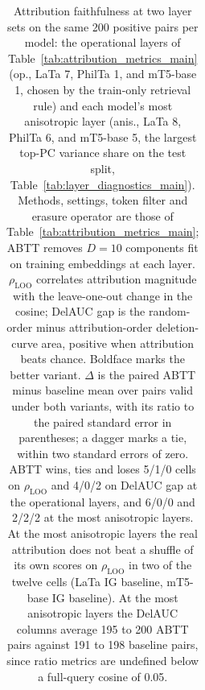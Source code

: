 \begin{table}[t]
\begin{tabular}{lllrrrrrr}
\bottomrule
\end{tabular}
\caption{Attribution faithfulness at two layer sets on the same 200 positive pairs per model: the operational layers of Table~\ref{tab:attribution_metrics_main} (op., LaTa 7, PhilTa 1, and mT5-base 1, chosen by the train-only retrieval rule) and each model's most anisotropic layer (anis., LaTa 8, PhilTa 6, and mT5-base 5, the largest top-PC variance share on the test split, Table~\ref{tab:layer_diagnostics_main}). Methods, settings, token filter and erasure operator are those of Table~\ref{tab:attribution_metrics_main}; ABTT removes $D=10$ components fit on training embeddings at each layer. $\rho_{\text{LOO}}$ correlates attribution magnitude with the leave-one-out change in the cosine; DelAUC gap is the random-order minus attribution-order deletion-curve area, positive when attribution beats chance. Boldface marks the better variant. $\Delta$ is the paired ABTT minus baseline mean over pairs valid under both variants, with its ratio to the paired standard error in parentheses; a dagger marks a tie, within two standard errors of zero. ABTT wins, ties and loses 5/1/0 cells on $\rho_{\text{LOO}}$ and 4/0/2 on DelAUC gap at the operational layers, and 6/0/0 and 2/2/2 at the most anisotropic layers. At the most anisotropic layers the real attribution does not beat a shuffle of its own scores on $\rho_{\text{LOO}}$ in two of the twelve cells (LaTa IG baseline, mT5-base IG baseline). At the most anisotropic layers the DelAUC columns average 195 to 200 ABTT pairs against 191 to 198 baseline pairs, since ratio metrics are undefined below a full-query cosine of 0.05.}
\label{tab:attribution_metrics_aniso}
\end{table}
